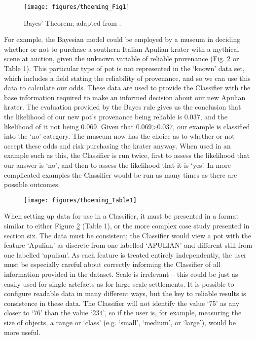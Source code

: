 		\begin{figure}[!htb]
			\texttt{[image: figures/thoeming\_Fig1]}
			\centering
			\caption{Bayes’ Theorem; adapted from \textcite[5]{Bayliss_2007}.}
			\label{fig:Fig1}
		\end{figure}	
	For example, the Bayesian model could be employed by a museum in deciding whether or not to purchase a southern Italian Apulian krater with a mythical scene at auction, given the unknown variable of reliable provenance (Fig. \ref{fig:Table1} or Table 1). This particular type of pot is not represented in the ‘known’ data set, which includes a field stating the reliability of provenance, and so we can use this data to calculate our odds. These data are used to provide the Classifier with the base information required to make an informed decision about our new Apulian krater. The evaluation provided by the Bayes rule gives us the conclusion that the likelihood of our new pot’s provenance being reliable is 0.037, and the likelihood of it not being 0.069. Given that 0.069>0.037, our example is classified into the ‘no’ category. The museum now has the choice as to whether or not accept these odds and risk purchasing the krater anyway. When used in an example such as this, the Classifier is run twice, first to assess the likelihood that our answer is ‘no’, and then to assess the likelihood that it is ‘yes’. In more complicated examples the Classifier would be run as many times as there are possible outcomes.
	
	\begin{figure}[!htb]
		\texttt{[image: figures/thoeming\_Table1]}
		\label{fig:Table1}
	\end{figure}
	When setting up data for use in a Classifier, it must be presented in a format similar to either Figure \ref{fig:Table1} (Table 1), or the more complex case study presented in section six. The data must be consistent; the Classifier would view a pot with the feature ‘Apulian’ as discrete from one labelled ‘APULIAN’ and different still from one labelled ‘apulian’. As each feature is treated entirely independently, the user must be especially careful about correctly informing the Classifier of all information provided in the dataset. Scale is irrelevant – this could be just as easily used for single artefacts as for large-scale settlements. It is possible to configure readable data in many different ways, but the key to reliable results is consistence in these data. The Classifier will not identify the value ‘75’ as any closer to ‘76’ than the value ‘234’, so if the user is, for example, measuring the size of objects, a range or ‘class’ (e.g. ‘small’, ‘medium’, or ‘large’), would be more useful.
	
